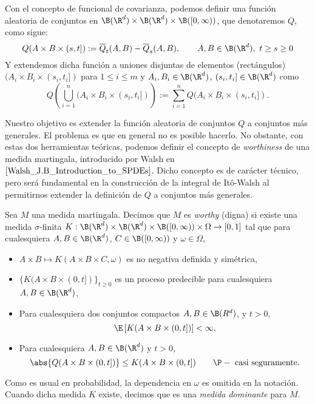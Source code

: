 Con el concepto de funcional de covarianza, podemos definir una función aleatoria de conjuntos en $\B(\R^{d})\times \B(\R^{d})\times \B([0,\infty))$, que denotaremos $Q$, como sigue:
\[
   Q(A\times B\times(s,t]):=\overline{Q}_t(A,B)-\overline{Q}_s(A,B), \qquad A,B\in \B(\R^{d}), \ t\geq s\geq 0
   \]
Y extendemos dicha función a uniones disjuntas de elementos (rectángulos)
$(A_i\times B_i\times(s_i,t_i])$ para $1\leq i \leq m$ y $A_i,B_i\in \B(\R^{d})$, $(s_i,t_i]\in \B(\R^{d})$ como 
\[
Q \left(\bigcup_{i=1}^{n}(A_i\times B_i\times(s_i,t_i])\right):=\sum_{i=1}^{n}Q(A_i\times B_i\times (s_i,t_i]).
\]
  
Nuestro objetivo es extender la función aleatoria de conjuntos $Q$ a conjuntos más generales. El problema es que en general no es posible hacerlo. No obstante, con estas dos herramientas teóricas, podemos definir el concepto de \textit{worthiness} de una medida martingala, introducido por Walsh en $\cite{Walsh_J.B_Introduction_to_SPDEs}$.
Dicho concepto es de carácter técnico, pero será fundamental en la construcción de la integral de Itô-Walsh al permitirnos extender la definición de $Q$ a conjuntos más generales.


\begin{dfn} 
Sea $M$ una medida martingala. Decimos que $M$ es \textit{worthy} (digna) si existe una medida $\sigma$-finita $K:\B(\R^{d})\times \B(\R^{d})\times \B([0,\infty))\times \Omega \to [0,1]$ tal que para cualesquiera $A,B\in \B(\R^{d})$, $C\in \B([0,\infty))$ y $\omega \in \Omega$, 
\begin{itemize}
   \item $A\times B\mapsto K(A\times B \times C,\omega)$ es no negativa definida y simétrica,
   \item $\{K(A\times B \times (0,t])\}_{t\geq0}$ es un proceso predecible para cualesquiera $A, B \in \B(\R^{d})$,
   \item Para cualesquiera dos conjuntos compactos $A,B \in \B(R^{d})$, y $t>0$, 
   \[
   \E\left[K(A\times B \times (0,t])\right]<\infty,    
   \]
   \item Para cualesquiera $A,B\in \B(\R^{d})$ y $t>0$,
   \[
   \abs{Q(A\times B \times (0,t])}\leq K(A\times B \times (0,t]) \qquad \P-\text{ casi seguramente.}   
   \]
\end{itemize}
Como es usual en probabilidad, la dependencia en $\omega$ es omitida en la notación. Cuando dicha medida $K$ existe, decimos que es una \textit{medida dominante} para $M$.
\end{dfn}


